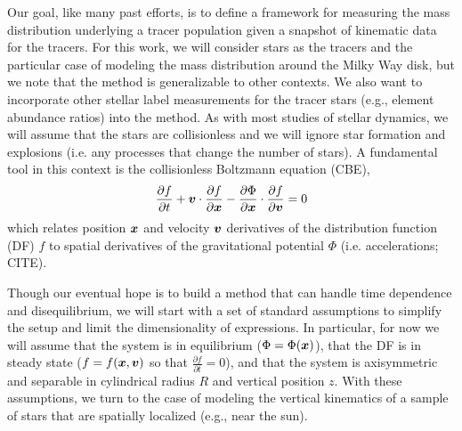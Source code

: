 Our goal, like many past efforts, is to define a framework for measuring the mass
distribution underlying a tracer population given a snapshot of kinematic data for the
tracers.
For this work, we will consider stars as the tracers and the particular case of modeling
the mass distribution around the Milky Way disk, but we note that the method is
generalizable to other contexts.
We also want to incorporate other stellar label measurements for the tracer stars (e.g.,
element abundance ratios) into the method.
As with most studies of stellar dynamics, we will assume that the stars are
collisionless and we will ignore star formation and explosions (i.e. any processes that
change the number of stars).
A fundamental tool in this context is the collisionless Boltzmann equation (CBE),
\begin{equation}
    \frac{\partial f}{\partial t} + \boldsymbol{v} \cdot \frac{\partial f}{\partial \boldsymbol{x}} - \frac{\partial \Phi}{\partial \boldsymbol{x}} \cdot \frac{\partial f}{\partial \boldsymbol{v}} = 0
    \label{eq:cbe}
\end{equation}
which relates position $\boldsymbol{x}$ and velocity $\boldsymbol{v}$ derivatives of the distribution
function (DF) $f$ to spatial derivatives of the gravitational potential $\Phi$ (i.e.
accelerations; CITE).

Though our eventual hope is to build a method that can handle time dependence and
disequilibrium, we will start with a set of standard assumptions to simplify the setup
and limit the dimensionality of expressions.
In particular, for now we will assume that the system is in equilibrium ($\Phi =
\Phi(\boldsymbol{x})$), that the DF is in steady state ($f = f(\boldsymbol{x}, \boldsymbol{v})$ so that
$\frac{\partial f}{\partial t}=0$), and that the system is axisymmetric and separable in
cylindrical radius $R$ and vertical position $z$.
With these assumptions, we turn to the case of modeling the vertical kinematics of a
sample of stars that are spatially localized (e.g., near the sun).



